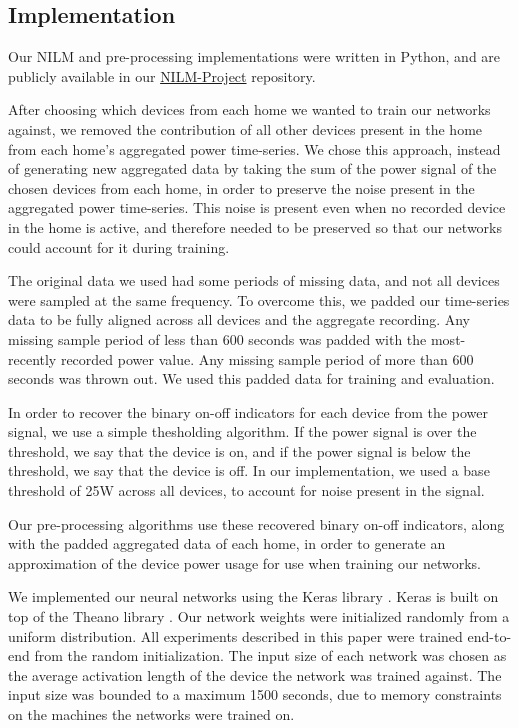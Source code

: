 \documentclass{article}
\begin{document}
\subsection{Implementation}
Our NILM and pre-processing implementations were written in Python, and are publicly available in our \href{https://github.com/CMPUT-466-551-ML-Project/NILM-Project}{NILM-Project} repository.

After choosing which devices from each home we wanted to train our networks against, we removed the contribution of all other devices present in the home from each home's aggregated power time-series.
We chose this approach, instead of generating new aggregated data by taking the sum of the power signal of the chosen devices from each home, in order to preserve the noise present in the aggregated power time-series.
This noise is present even when no recorded device in the home is active, and therefore needed to be preserved so that our networks could account for it during training.

The original data we used had some periods of missing data, and not all devices were sampled at the same frequency.
To overcome this, we padded our time-series data to be fully aligned across all devices and the aggregate recording.
Any missing sample period of less than 600 seconds was padded with the most-recently recorded power value.
Any missing sample period of more than 600 seconds was thrown out.
We used this padded data for training and evaluation.

In order to recover the binary on-off indicators for each device from the power signal, we use a simple thesholding algorithm.
If the power signal is over the threshold, we say that the device is on, and if the power signal is below the threshold, we say that the device is off.
In our implementation, we used a base threshold of 25W across all devices, to account for noise present in the signal.

Our pre-processing algorithms use these recovered binary on-off indicators, along with the padded aggregated data of each home, in order to generate an approximation of the device power usage for use when training our networks.

We implemented our neural networks using the Keras library \cite{Keras}.
Keras is built on top of the Theano library \cite{Theano, Theano2}.
Our network weights were initialized randomly from a uniform distribution.
All experiments described in this paper were trained end-to-end from the random initialization.
The input size of each network was chosen as the average activation length of the device the network was trained against.
The input size was bounded to a maximum 1500 seconds, due to memory constraints on the machines the networks were trained on.
\end{document}
